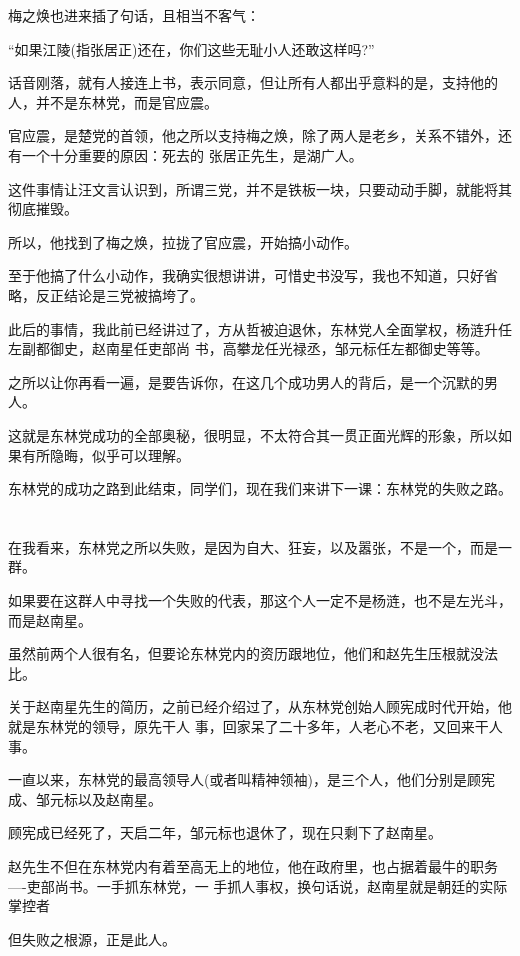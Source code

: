 \documentclass[11pt,a4paper,onecolumn]{article}
\begin{document}
梅之焕也进来插了句话，且相当不客气：

``如果江陵(指张居正)还在，你们这些无耻小人还敢这样吗?''

话音刚落，就有人接连上书，表示同意，但让所有人都出乎意料的是，支持他的人，并不是东林党，而是官应震。

官应震，是楚党的首领，他之所以支持梅之焕，除了两人是老乡，关系不错外，还有一个十分重要的原因：死去的
张居正先生，是湖广人。

这件事情让汪文言认识到，所谓三党，并不是铁板一块，只要动动手脚，就能将其彻底摧毁。

所以，他找到了梅之焕，拉拢了官应震，开始搞小动作。

至于他搞了什么小动作，我确实很想讲讲，可惜史书没写，我也不知道，只好省略，反正结论是三党被搞垮了。

此后的事情，我此前已经讲过了，方从哲被迫退休，东林党人全面掌权，杨涟升任左副都御史，赵南星任吏部尚
书，高攀龙任光禄丞，邹元标任左都御史等等。

之所以让你再看一遍，是要告诉你，在这几个成功男人的背后，是一个沉默的男人。

这就是东林党成功的全部奥秘，很明显，不太符合其一贯正面光辉的形象，所以如果有所隐晦，似乎可以理解。

东林党的成功之路到此结束，同学们，现在我们来讲下一课：东林党的失败之路。

\section[\thesection]{}

在我看来，东林党之所以失败，是因为自大、狂妄，以及嚣张，不是一个，而是一群。

如果要在这群人中寻找一个失败的代表，那这个人一定不是杨涟，也不是左光斗，而是赵南星。

虽然前两个人很有名，但要论东林党内的资历跟地位，他们和赵先生压根就没法比。

关于赵南星先生的简历，之前已经介绍过了，从东林党创始人顾宪成时代开始，他就是东林党的领导，原先干人
事，回家呆了二十多年，人老心不老，又回来干人事。

一直以来，东林党的最高领导人(或者叫精神领袖)，是三个人，他们分别是顾宪成、邹元标以及赵南星。

顾宪成已经死了，天启二年，邹元标也退休了，现在只剩下了赵南星。

赵先生不但在东林党内有着至高无上的地位，他在政府里，也占据着最牛的职务----吏部尚书。一手抓东林党，一
手抓人事权，换句话说，赵南星就是朝廷的实际掌控者

但失败之根源，正是此人。
\end{document}
